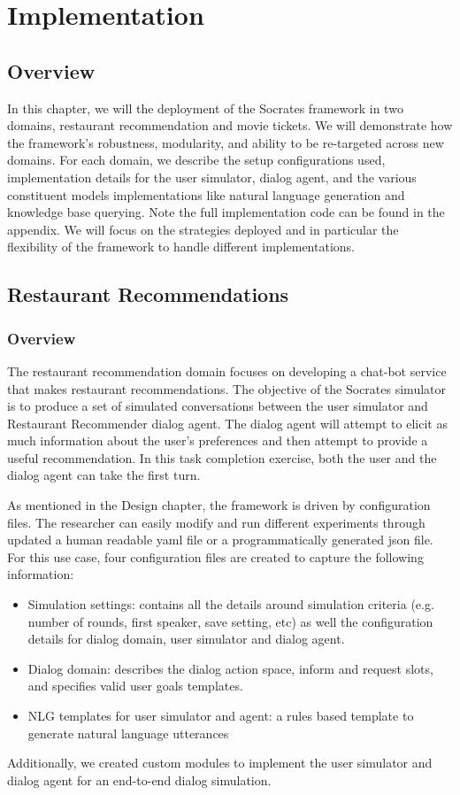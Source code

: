 \chapter{Implementation}
\label{chap:implementation}

\section{Overview}

In this chapter, we will the deployment of the Socrates framework in two domains, restaurant recommendation and movie tickets. We will demonstrate how the framework's robustness, modularity, and ability to be re-targeted across new domains. For each domain, we describe the setup configurations used, implementation details for the user simulator, dialog agent, and the various constituent models implementations like natural language generation and knowledge base querying. Note the full implementation code can be found in the appendix. We will focus on the strategies deployed and in particular the flexibility of the framework to handle different implementations.

\section{Restaurant Recommendations}

\subsection{Overview}

The restaurant recommendation domain focuses on developing a chat-bot service that makes restaurant recommendations. The objective of the Socrates simulator is to produce a set of simulated conversations between the user simulator and Restaurant Recommender dialog agent. The dialog agent will attempt to elicit as much information about the user's preferences and then attempt to provide a useful recommendation. In this task completion exercise, both the user and the dialog agent can take the first turn. 

As mentioned in the Design chapter, the framework is driven by configuration files. The researcher can easily modify and run different experiments through updated a human readable yaml file or a programmatically generated json file. For this use case, four configuration files are created to capture the following information:
\begin{itemize}
	\item Simulation settings: contains all the details around simulation criteria (e.g. number of rounds, first speaker, save setting, etc) as well the configuration details for dialog domain, user simulator and dialog agent. 
	\item Dialog domain: describes the dialog action space, inform and request slots, and specifies valid user goals templates.
	\item NLG templates for user simulator and agent: a rules based template to generate natural language utterances 
\end{itemize}
Additionally, we created custom modules to implement the user simulator and dialog agent for an end-to-end dialog simulation. 

